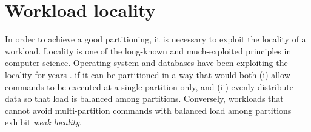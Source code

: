 \section{Workload locality}
\label{sysmodel:locality}
In order to achieve a good partitioning, it is necessary to exploit the locality
of a workload. Locality is one of the long-known and much-exploited principles in
computer science. Operating system and databases have been exploiting the
locality for years \cite{denning2006locality}.  if it can be partitioned in a way that would both (i) allow commands
to be executed at a single partition only, and (ii) evenly distribute data so
that load is balanced among partitions. Conversely, workloads that cannot avoid
multi-partition commands with balanced load among partitions exhibit \emph{weak
locality}.
